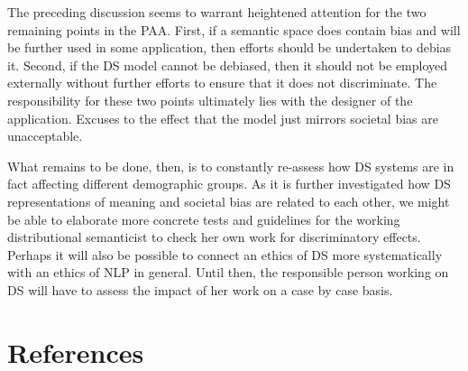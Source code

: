 \documentclass{article}
\begin{document}
The preceding discussion seems to warrant heightened attention for the two remaining points in the PAA. First, if a semantic space does contain bias and will be further used in some application, then efforts should be undertaken to debias it. Second, if the DS model cannot be debiased, then it should not be employed externally without further efforts to ensure that it does not discriminate. The responsibility for these two points ultimately lies with the designer of the application. Excuses to the effect that the model just mirrors societal bias are unacceptable.

What remains to be done, then, is to constantly re-assess how DS systems are in fact affecting different demographic groups. As it is further investigated how DS representations of meaning and societal bias are related to each other, we might be able to elaborate more concrete tests and guidelines for the working distributional semanticist to check her own work for discriminatory effects. Perhaps it will also be possible to connect an ethics of DS more systematically with an ethics of NLP in general. Until then, the responsible person working on DS will have to assess the impact of her work on a case by case basis. 

\section{References}\hypertarget{sec6}{ }
\printbibliography
\end{document}
